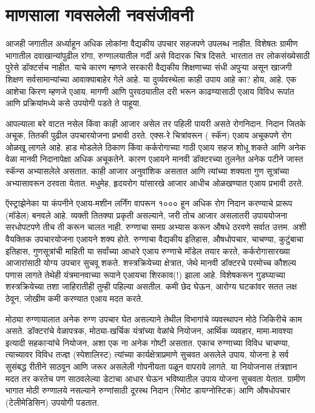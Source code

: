 \chapter{माणसाला गवसलेली नवसंजीवनी}

आजही जगातील अर्ध्याहून अधिक लोकांना वैद्यकीय उपचार सहजपणे उपलब्ध नाहीत. विशेषतः ग्रामीण भागातील दवाखान्यांपुढील रांगा, रुग्णालयातील गर्दी असे विदारक चित्र दिसते. भारतात तर लोकसंख्येसाठी पुरेसे डॉक्टर्सच नाहीत. याचे कारण म्हणजे सरकारी वैद्यकीय शिक्षणाच्या संधी अपुऱ्या असून खाजगी शिक्षण सर्वसामान्यांच्या आवाक्याबाहेर गेले आहे. या दुर्व्यवस्थेला काही उपाय आहे का? होय, आहे. एक आशेचा किरण म्हणजे एआय. मागणी आणि पुरवठ्यातील दरी भरून काढण्यासाठी एआय विविध रूपांत आणि प्रक्रियांमध्ये कसे उपयोगी पडते ते पाहूया.

आपल्याला बरे वाटत नसेल किंवा काही आजार असेल तर पहिली पायरी असते रोगनिदान. निदान जितके अचूक, तितकी पुढील उपचारयोजना प्रभावी ठरते. एक्स-रे चित्रांवरून ( स्कॅन) एआय अचूकपणे रोग ओळखू लागले आहे. हाड मोडलेले ठिकाण किंवा कर्करोगाच्या गाठी एआय सहज शोधू शकते आणि अनेक वेळा मानवी निदानापेक्षा अधिक अचूकतेने. कारण एआयने मानवी डॉक्टरच्या तुलनेत अनेक पटीने जास्त स्कॅन्स अभ्यासलेले असतात. काही आजार अनुवांशिक असतात आणि त्यांच्या शक्यता गुण सूत्रांच्या अभ्यासावरून ठरवता येतात.  मधुमेह, हृदयरोग यांसारखे आजार आधीच ओळखण्यात एआय प्रभावी ठरते. 

ऍस्ट्राझेनेका या कंपनीने एआय-मशीन लर्निंग वापरून १००० हून अधिक रोग निदान करण्याचे प्रारूप (मॉडेल) बनवले आहे. व्यक्ती तितक्या प्रकृती असल्याने, जरी तोच आजार असलातरी उपाययोजना सरधोपटपणे तीच ती करून चालत नाही. रुग्णाचा समग्र अभ्यास करून औषधे ठरवणे सर्वात उत्तम. अशी वैयक्तिक उपचारयोजना एआयने शक्य होते. रुग्णाचा वैद्यकीय इतिहास, औषधोपचार, चाचण्या, कुटुंबाचा इतिहास, गुणसूत्रांची माहिती या सर्वांच्या आधारे एआय रुग्णाचे मॉडेल तयार करते,  कर्करोगासारख्या आजारांसाठी योग्य उपचार सुचवू शकते.  शस्त्रक्रियेच्या क्षेत्रात, जेथे मानवी डॉक्टरचे परमोच्च कौशल्य पणास लागते तेथेही यंत्रमानवाच्या रूपाने एआयचा शिरकाव(!) झाला आहे. विशेषकरून गुडघ्याच्या शस्त्रक्रियेच्या तशा जाहिरातीही तुम्ही पहिल्या असतील. कमी छेद घेऊन, आरोग्य घटकांवर सतत लक्ष ठेवून, जोखीम कमी करण्यात एआय मदत करते.

मोठ्या रुग्णायालात अनेक रुग्ण उपचार घेत असल्याने तेथील विभागांचे व्यवस्थापन मोठे जिकिरीचे काम असते. डॉक्टरांचे वेळापत्रक, मोठ्या-खर्चिक यंत्रांच्या वेळांचे नियोजन, आर्थिक व्यवहार, मामा-मावश्या इत्यादी सहकाऱ्यांचे नियोजन, अशा एक ना अनेक गोष्टी असतात. एकाच रुग्णाच्या विविध चाचण्या, त्याच्यावर विविध तज्ज्ञ  (स्पेशालिस्ट) त्यांच्या कार्यक्षेत्राप्रमाणे सुचवत असलेले  उपाय, योजना हे सर्व सुसंबद्ध रीतीने साठवून आणि जरूर असलेली गोपनीयता पळून वापरावे लागते. या नियोजनास तंत्रज्ञान मदत तर करतेच पण साठवलेल्या डेटाचा आधार घेऊन भविष्यातील उपाय योजना सुचवता येतात. ग्रामीण भागात मोठी रुग्णालये नसल्याने रुग्णांसाठी दूरस्थ निदान (रिमोट डायग्नोस्टिक) आणि औषधोपचार (टेलीमेडिसिन) उपयोगी पडतात. 

